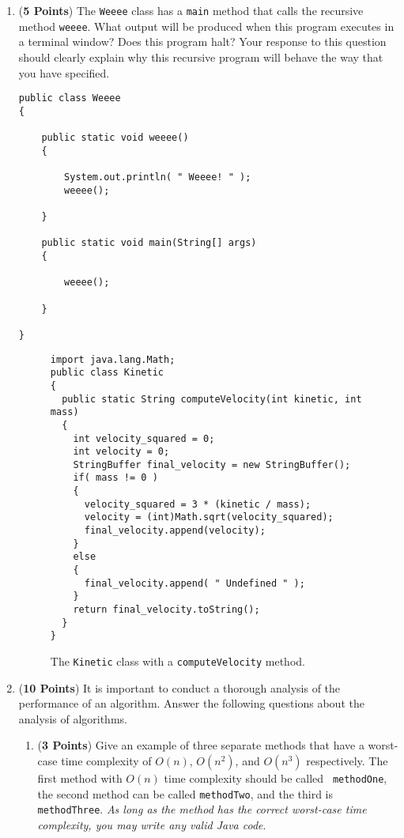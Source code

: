 \documentclass[12pt]{article}
\begin{document}
\begin{enumerate}
\begin{enumerate}
\item ({\bf 5 Points}) The {\tt Weeee} class has a {\tt main} method that calls the recursive method {\tt weeee}.  What
  output will be produced when this program executes in a terminal window?  Does this program halt? Your response to
  this question should clearly explain why this recursive program will behave the way that you have specified. 

\begin{verbatim}
public class Weeee
{

    public static void weeee()
    {

        System.out.println( " Weeee! " );
        weeee();

    }

    public static void main(String[] args)
    {

        weeee();

    }

}
\end{verbatim}

\begin{figure}[p]

\begin{verbatim}
import java.lang.Math;
public class Kinetic
{
  public static String computeVelocity(int kinetic, int mass)
  {
    int velocity_squared = 0;
    int velocity = 0;
    StringBuffer final_velocity = new StringBuffer();
    if( mass != 0 )
    {
      velocity_squared = 3 * (kinetic / mass);
      velocity = (int)Math.sqrt(velocity_squared);
      final_velocity.append(velocity);
    }
    else
    {
      final_velocity.append( " Undefined " );
    }
    return final_velocity.toString();
  }
}
\end{verbatim}

\caption{The {\tt Kinetic} class with a {\tt computeVelocity} method.}
\label{Kinetic}

\end{figure}

\newpage

\item ({\bf 10 Points}) It is important to conduct a thorough analysis of the performance of an algorithm.  Answer the
  following questions about the analysis of algorithms.

  \begin{enumerate}

    \item ({\bf 3 Points}) Give an example of three separate methods that have a worst-case time complexity of $O(n)$,
      $O(n^2)$, and $O(n^3)$ respectively.  The first method with $O(n)$ time complexity should be called {\tt
      methodOne}, the second method can be called {\tt methodTwo}, and the third is {\tt methodThree}.  {\em As long as
      the method has the correct worst-case time complexity, you may write any valid Java code}.


\end{enumerate}
\end{enumerate}
\end{enumerate}
\end{document}
